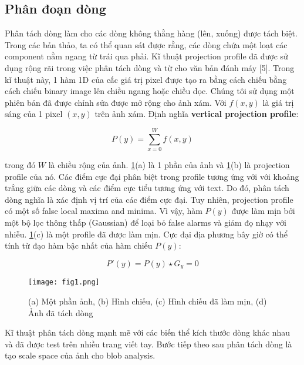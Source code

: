 \documentclass[a4paper]{article}
\begin{document}
\subsection{Phân đoạn dòng}
Phân tách dòng làm cho các dòng không thằng hàng (lên, xuống) được tách biệt. Trong các bản thảo, ta có thể quan sát được rằng, các dòng chứa một loạt các component nằm ngang từ trái qua phải. Kĩ thuật projection profile đã được sử dụng rộng rãi trong việc phân tách dòng và từ cho văn bản đánh máy [5]. Trong kĩ thuật này, 1 hàm 1D của cấc giá trị pixel được tạo ra bằng cách chiếu bằng cách chiếu binary image lên chiều ngang hoặc chiều dọc. Chúng tôi sử dụng một phiên bản đã được chỉnh sửa được mở rộng cho ảnh xám. Với $f(x, y)$  là giá trị sáng của 1 pixel $(x, y)$ trên ảnh xám. Định nghĩa \textbf{vertical projection profile}:

\begin{equation}
    P(y) = \sum ^W_{x = 0}f(x, y)
\end{equation}

trong đó $W$ là chiều rộng của ảnh. \ref{fig:fig1}(a) là 1 phần của ảnh và \ref{fig:fig1}(b) là projection profile của nó. Các điểm cực đại phân biệt trong profile tương ứng với với khoảng trắng giữa các dòng và các điểm cực tiểu tương ứng với text. Do đó, phân tách dòng nghĩa là xác định vị trí của các điểm cực đại. Tuy nhiên, projection profile có một số false local maxima and minima. Vì vậy, hàm $P(y)$ được làm mịn bởi một bộ lọc thông thấp (Gaussian) để loại bỏ false alarms và giảm đọ nhạy với nhiễu. \ref{fig:fig1}(c) là một profile đã được làm mịn. Cực đại địa phương bây giờ có thể tính từ đạo hàm bậc nhất của hàm chiếu $P(y)$:

\begin{equation}
    P'(y) = P(y) \star G_y = 0
\end{equation}

\begin{figure}
    \centering
    \texttt{[image: fig1.png]}
    \caption{(a) Một phần ảnh, (b) Hình chiếu, (c) Hình chiếu đã làm mịn, (d) Ảnh đã tách dòng}
    \label{fig:fig1}
\end{figure}

Kĩ thuật phân tách dòng mạnh mẽ với các biến thể kích thước dòng khác nhau và đã được test trên nhiều trang viết tay. Bước tiếp theo sau phân tách dòng là tạo scale space của ảnh cho blob analysis.
\end{document}
